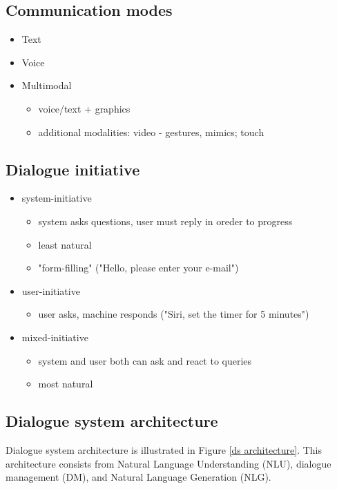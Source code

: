 \subsection{Communication modes}
\begin{itemize}
  \item Text
  \item Voice
  \item Multimodal
    \begin{itemize}
      \item voice/text + graphics
      \item additional modalities: video - gestures, mimics; touch
    \end{itemize}
\end{itemize}

\subsection{Dialogue initiative}
\begin{itemize}
  \item system-initiative
    \begin{itemize}
      \item system asks questions, user must reply in oreder to progress
      \item least natural
      \item "form-filling" ("Hello, please enter your e-mail") 
    \end{itemize}
  \item user-initiative
    \begin{itemize}
      \item user asks, machine responds ("Siri, set the timer for 5 minutes")
    \end{itemize}
  \item mixed-initiative
    \begin{itemize}
      \item system and user both can ask and react to queries
      \item most natural
    \end{itemize}
\end{itemize}

\subsection{Dialogue system architecture} 
Dialogue system architecture is illustrated in Figure \ref{ds architecture}. This architecture consists from Natural Language Understanding (NLU), dialogue management (DM), and Natural Language Generation (NLG).

